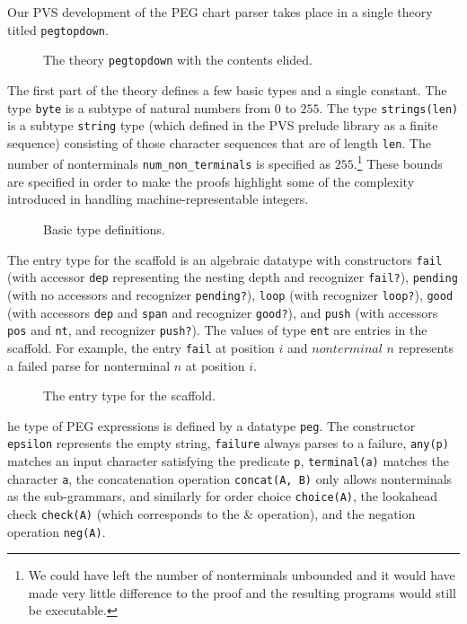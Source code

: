 \documentclass[sigplan,10pt,anonymous,review]{acmart}\settopmatter{printfolios=true,printccs=false,printacmref=false}
\begin{document}
\begin{CCSXML}
Our PVS development of the PEG chart parser takes place in a single theory
titled \texttt{pegtopdown}.
\begin{figure}[h!]
			
			\caption{The theory \texttt{pegtopdown} with the contents elided.}
			\label{pvs:pegtopdown}
\end{figure}


The first part of the theory defines a few basic types and a single
constant.  The type \texttt{byte} is a subtype of natural numbers from
$0$ to $255$\@.  The type \texttt{strings(len)} is a subtype
\texttt{string} type (which defined in the PVS prelude library as a
finite sequence) consisting of those character sequences that are of
length \texttt{len}\@.  The number of nonterminals
\texttt{num\_non\_terminals} is specified as $255$\@.\footnote{We could
  have left the number of nonterminals unbounded and it would have
  made very little difference to the proof and the resulting programs
  would still be executable.}  These bounds are specified in order to
make the proofs highlight some of the complexity introduced in
handling machine-representable integers.
               
\begin{figure}[h!]
			
			\caption{Basic type definitions.}
			\label{pvs:byte}
\end{figure}

The entry type for the scaffold is an algebraic datatype with
constructors \texttt{fail} (with accessor \texttt{dep} representing
the nesting depth and recognizer \texttt{fail?}), \texttt{pending}
(with no accessors and recognizer \texttt{pending?}), \texttt{loop}
(with recognizer \texttt{loop?}), \texttt{good} (with accessors
\texttt{dep} and \texttt{span} and recognizer \texttt{good?}), and
\texttt{push} (with accessors \texttt{pos} and \texttt{nt}, and
recognizer \texttt{push?}).  The values of type \texttt{ent} are
entries in the scaffold.  For example, the entry \texttt{fail} at
position $i$ and $nonterminal$ $n$ represents a failed parse for
nonterminal $n$ at position $i$.

\begin{figure}[h!]
			
			\caption{The entry type for the scaffold.}
			\label{pvs:ent}
\end{figure}

he type of PEG expressions is defined by a datatype \texttt{peg}.  The
constructor \texttt{epsilon} represents the empty string,
\texttt{failure} always parses to a failure, \texttt{any(p)} matches
an input character satisfying the predicate \texttt{p},
\texttt{terminal(a)} matches the character \texttt{a}, the
concatenation operation \texttt{concat(A, B)} only allows nonterminals
as the sub-grammars, and similarly for order choice
\texttt{choice(A)}, the lookahead check \texttt{check(A)} (which
corresponds to the $\&$ operation), and the negation operation
\texttt{neg(A)}\@.


\end{CCSXML}
\end{document}
